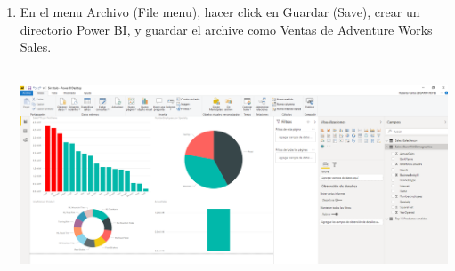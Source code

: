 \begin{enumerate}[1.]
	\item En el menu Archivo (File menu), hacer click en Guardar (Save), crear un directorio Power BI, y guardar el archive como Ventas de Adventure Works Sales.
	\\
	\\
	\begin{center}
	\includegraphics[width=16cm]{./Imagenes/Imagen5} 
	\end{center}

\end{enumerate}


